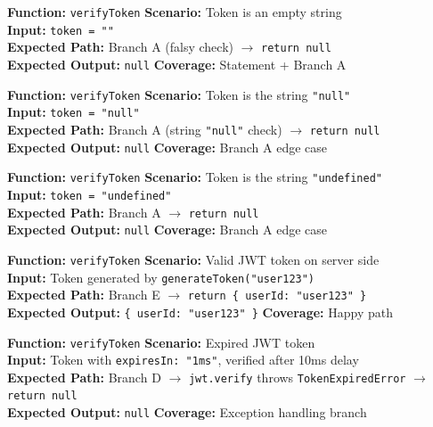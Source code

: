 \documentclass[12pt,a4paper]{report}
\newcommand{\pone}{\textbf{\color{p1red}P1}}
\begin{document}
\begin{tcolorbox}[testbox,title={AUTH-001 \hfill \pone}]
\textbf{Function:} \texttt{verifyToken} \quad \textbf{Scenario:} Token is an empty string \\
\textbf{Input:} \texttt{token = ""} \\
\textbf{Expected Path:} Branch A (falsy check) $\to$ \texttt{return null} \\
\textbf{Expected Output:} \texttt{null} \quad \textbf{Coverage:} Statement + Branch A
\end{tcolorbox}

\begin{tcolorbox}[testbox,title={AUTH-002 \hfill \pone}]
\textbf{Function:} \texttt{verifyToken} \quad \textbf{Scenario:} Token is the string \texttt{"null"} \\
\textbf{Input:} \texttt{token = "null"} \\
\textbf{Expected Path:} Branch A (string \texttt{"null"} check) $\to$ \texttt{return null} \\
\textbf{Expected Output:} \texttt{null} \quad \textbf{Coverage:} Branch A edge case
\end{tcolorbox}

\begin{tcolorbox}[testbox,title={AUTH-003 \hfill \pone}]
\textbf{Function:} \texttt{verifyToken} \quad \textbf{Scenario:} Token is the string \texttt{"undefined"} \\
\textbf{Input:} \texttt{token = "undefined"} \\
\textbf{Expected Path:} Branch A $\to$ \texttt{return null} \\
\textbf{Expected Output:} \texttt{null} \quad \textbf{Coverage:} Branch A edge case
\end{tcolorbox}

\begin{tcolorbox}[testbox,title={AUTH-004 \hfill \pone}]
\textbf{Function:} \texttt{verifyToken} \quad \textbf{Scenario:} Valid JWT token on server side \\
\textbf{Input:} Token generated by \texttt{generateToken("user123")} \\
\textbf{Expected Path:} Branch E $\to$ \texttt{return \{ userId: "user123" \}} \\
\textbf{Expected Output:} \texttt{\{ userId: "user123" \}} \quad \textbf{Coverage:} Happy path
\end{tcolorbox}

\begin{tcolorbox}[criticalbox,title={AUTH-005 \hfill \pone\ --- Expired Token}]
\textbf{Function:} \texttt{verifyToken} \quad \textbf{Scenario:} Expired JWT token \\
\textbf{Input:} Token with \texttt{expiresIn: "1ms"}, verified after 10ms delay \\
\textbf{Expected Path:} Branch D $\to$ \texttt{jwt.verify} throws \texttt{TokenExpiredError} $\to$ \texttt{return null} \\
\textbf{Expected Output:} \texttt{null} \quad \textbf{Coverage:} Exception handling branch
\end{tcolorbox}
\end{document}
